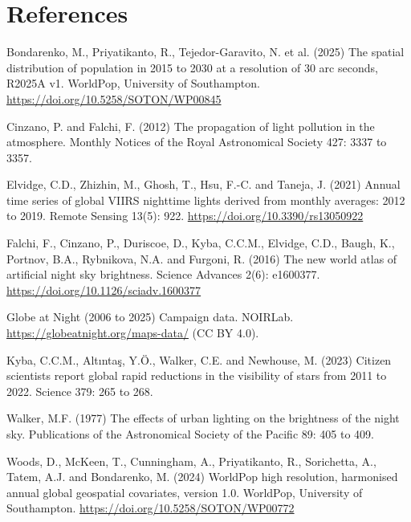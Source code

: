 \documentclass[11pt,a4paper]{article}
\begin{document}
\section*{References}
\small
\begin{description}\setlength{\itemsep}{2pt}
\item Bondarenko, M., Priyatikanto, R., Tejedor-Garavito, N. et al. (2025) The spatial distribution of population in 2015 to 2030 at a resolution of 30 arc seconds, R2025A v1. WorldPop, University of Southampton. \url{https://doi.org/10.5258/SOTON/WP00845}
\item Cinzano, P. and Falchi, F. (2012) The propagation of light pollution in the atmosphere. Monthly Notices of the Royal Astronomical Society 427: 3337 to 3357.
\item Elvidge, C.D., Zhizhin, M., Ghosh, T., Hsu, F.-C. and Taneja, J. (2021) Annual time series of global VIIRS nighttime lights derived from monthly averages: 2012 to 2019. Remote Sensing 13(5): 922. \url{https://doi.org/10.3390/rs13050922}
\item Falchi, F., Cinzano, P., Duriscoe, D., Kyba, C.C.M., Elvidge, C.D., Baugh, K., Portnov, B.A., Rybnikova, N.A. and Furgoni, R. (2016) The new world atlas of artificial night sky brightness. Science Advances 2(6): e1600377. \url{https://doi.org/10.1126/sciadv.1600377}
\item Globe at Night (2006 to 2025) Campaign data. NOIRLab. \url{https://globeatnight.org/maps-data/} (CC BY 4.0).
\item Kyba, C.C.M., Alt\i nta\c{s}, Y.\"O., Walker, C.E. and Newhouse, M. (2023) Citizen scientists report global rapid reductions in the visibility of stars from 2011 to 2022. Science 379: 265 to 268.
\item Walker, M.F. (1977) The effects of urban lighting on the brightness of the night sky. Publications of the Astronomical Society of the Pacific 89: 405 to 409.
\item Woods, D., McKeen, T., Cunningham, A., Priyatikanto, R., Sorichetta, A., Tatem, A.J. and Bondarenko, M. (2024) WorldPop high resolution, harmonised annual global geospatial covariates, version 1.0. WorldPop, University of Southampton. \url{https://doi.org/10.5258/SOTON/WP00772}
\end{description}
\end{document}
